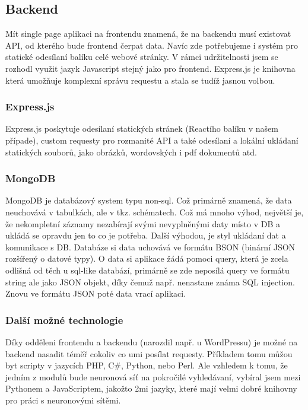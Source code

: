 \subsection{Backend}
Mít single page aplikaci na frontendu znamená, že na backendu musí existovat API,
od kterého bude frontend čerpat data.
Navíc zde potřebujeme i systém pro statické odesílaní balíku celé webové stránky.
V rámci udržitelnosti jsem se rozhodl využit jazyk Javascript stejný jako pro frontend.
Express.js je knihovna která umožňuje komplexní správu requestu a
stala se tudíž jasnou volbou.

\subsubsection{Express.js}
Express.js poskytuje odesílaní statických stránek (Reactího balíku v našem případe),
custom requesty pro rozmanité API a také odesílaní a lokální ukládaní statických souborů,
jako obrázků, wordovských i pdf dokumentů atd.

\subsubsection{MongoDB}
MongoDB je databázový system typu non-sql.
Což primárně znamená, že data neuchovává v tabulkách, ale v tkz. schématech.
Což má mnoho výhod, největší je, že nekompletní záznamy nezabírají
svými nevyplněnými daty místo v DB a ukládá se opravdu jen to co je potřeba.
Další výhodou, je styl ukládaní dat a komunikace s DB.
Databáze si data uchovává ve formátu BSON (binární JSON rozšířený o datové typy).
O data si aplikace žádá pomoci query,
která je zcela odlišná od těch u sql-like databází,
primárně se zde neposílá query ve formátu string ale jako JSON objekt,
díky čemuž např. nenastane známa SQL injection.
Znovu ve formátu JSON poté data vrací aplikaci.

\subsubsection{Další možné technologie}
Díky odděleni frontendu a backendu (narozdil např. u WordPressu) je možné
na backend nasadit téměř cokoliv co umi posílat requesty.
Příkladem tomu můžou byt scripty v jazycích PHP, C\#, Python, nebo Perl.
Ale vzhledem k tomu, že jedním z modulů bude neuronová síť na pokročilé vyhledávaní,
vybíral jsem mezi Pythonem a JavaScriptem, jakožto 2mi jazyky, které
mají velmi dobré knihovny pro práci s neuronovými sítěmi.

